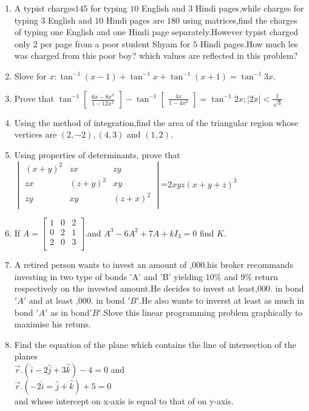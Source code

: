 \documentclass[12pt,-letter paper]{article}
\providecommand{\mydet}[1]{\ensuremath{\begin{vmatrix}#1\end{vmatrix}}}
\providecommand{\myvec}[1]{\ensuremath{\begin{bmatrix}#1\end{bmatrix}}}
\providecommand{\brak}[1]{\ensuremath{\left(#1\right)}}
\begin{document}
\begin{enumerate}
 \item A typist charges\rupee$145$ for typing $10$ English and $3$ Hindi pages,while charges for typing $3$ English and $10$ Hindi pages are \rupee$180$ using matrices,find the charges of typing one English and one Hindi page separately.However typist charged only \rupee$2$  per page from a poor student Shyam for $5$ Hindi pages.How much les was charged from this poor boy? which values are reflected in this problem?

 \item Slove for $x:\tan^{-1}\brak{x-1}+\tan^{-1}x+\tan^{-1}\brak{x+1}=\tan^{-1}3x$.



 \item Prove that $\tan^{-1}\myvec{\frac{6x-8x^3}{1-12x^2}}-\tan^{-1}\myvec{\frac{4x}{1-4x^2}}=\tan^{-1}2x;|2x|<\frac{1}{\sqrt{3}}$



 \item Using the method of integration,find the area of the triangular region whose vertices are $\brak{2,-2},\brak{4,3}$ and $\brak{1,2}$.
   
 \item Using properties of determinants, prove that $\mydet{ \brak{x+y}^{2} & zx &  zy\\                          zx & \brak{z+y}^{2} & xy\\                             zy & xy & \brak{z+x}^{2}\\}$=$2xyz\brak{x+y+z}^{3}$





\item  If $A=\myvec{1 & 0 & 2 \\
	           0  & 2 & 1 \\
	            2 & 0 & 3 \\}$.and $A^3-6A^2+7A+kI_3=0$  find $K$.



  \item A retired person wants to invest an amount of ,000.his broker recommands investing in two type of bonds 'A' and 'B' yielding $10\%$ and $9\%$ return respectively on the invested amount.He decides to invest at least,000. in bond $'A'$ and at least ,000. in bond $'B'$.He also wants to inverst at least as much in bond $'A'$ as in bond$'B'$.Slove this linear programming problem graphically to maximise his retuns.


  \item Find the equation of the plane which contains the line of intersection of the planes\\
	  $\overset{\rightarrow}{r}.\brak{\hat{i}-2\hat{j}+3\hat{k}}-4=0$ and \\ $\overset{\rightarrow}{r}.\brak{-2\hat{i}=\hat{j}+\hat{k}}+5=0$\\ and whose intercept on x-axis is equal to that of on y-axis.
    


\end{enumerate}
\end{document}
